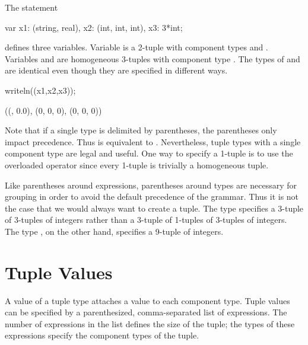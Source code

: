 \begin{example}
\begin{chapelpre}
\end{chapelpre}
The statement
\begin{chapel}
var x1: (string, real),
    x2: (int, int, int),
    x3: 3*int;
\end{chapel}
defines three variables.  Variable  is a 2-tuple with
component types  and .  Variables 
and  are homogeneous 3-tuples with component type .
The types of  and  are identical even though they
are specified in different ways.
\begin{chapelpost}
writeln((x1,x2,x3));
\end{chapelpost}
\begin{chapeloutput}
((, 0.0), (0, 0, 0), (0, 0, 0))
\end{chapeloutput}
\end{example}

Note that if a single type is delimited by parentheses, the
parentheses only impact precedence.  Thus  is equivalent
to .  Nevertheless, tuple types with a single component type
are legal and useful.  One way to specify a 1-tuple is to use the
overloaded \chpl{*} operator since every 1-tuple is trivially a
homogeneous tuple.

\begin{rationale}
Like parentheses around expressions, parentheses around types are
necessary for grouping in order to avoid the default precedence of the
grammar.  Thus it is not the case that we would always want to create
a tuple.  The type  specifies a 3-tuple of 3-tuples of
integers rather than a 3-tuple of 1-tuples of 3-tuples of integers.
The type , on the other hand, specifies a 9-tuple of
integers.
\end{rationale}

\section{Tuple Values}
\label{Tuple_Values}

A value of a tuple type attaches a value to each component type.
Tuple values can be specified by a parenthesized, comma-separated list
of expressions.  The number of expressions in the list defines the
size of the tuple; the types of these expressions specify the
component types of the tuple.

